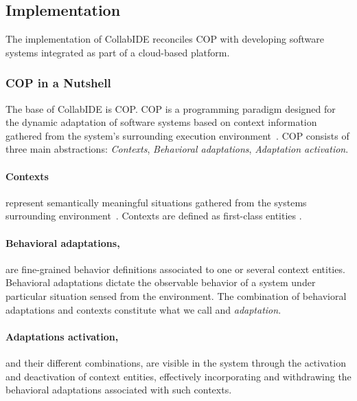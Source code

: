 \subsection{Implementation}
\label{sec:implementation}

The implementation of CollabIDE reconciles \ac{COP} with developing software systems integrated as part of a cloud-based platform.

\subsubsection{\ac{COP} in a Nutshell}
The base of CollabIDE is \acf{COP}. \ac{COP} is a programming paradigm designed for the dynamic adaptation of software systems based on context information gathered from the system's surrounding execution environment~\cite{salvaneschi+12survey}. \ac{COP} consists of three main abstractions: \emph{Contexts}, \emph{Behavioral adaptations}, \emph{Adaptation activation}.

\paragraph{Contexts} represent semantically meaningful situations gathered from the systems surrounding environment~\cite{dey01}. Contexts are defined as first-class entities .

\paragraph{Behavioral adaptations,} are fine-grained behavior definitions associated to one or several context entities. Behavioral adaptations dictate the observable behavior of a system under particular situation sensed from the environment. The combination of behavioral adaptations and contexts constitute what we call and \emph{adaptation}.

\paragraph{Adaptations activation,} and their different combinations, are visible in the system through the activation and deactivation of context entities, effectively incorporating and withdrawing the behavioral adaptations associated with such contexts.



